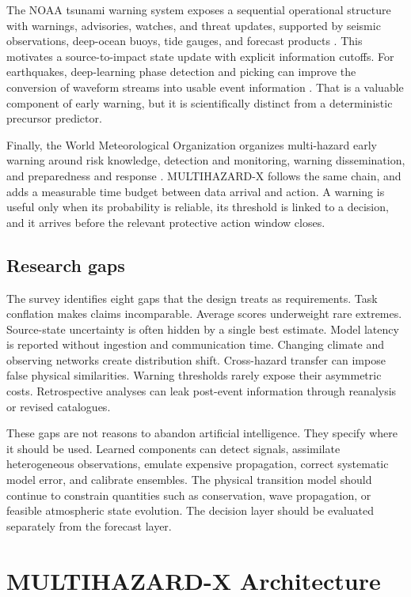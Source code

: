 \documentclass[conference]{IEEEtran}
\begin{document}
The NOAA tsunami warning system exposes a sequential operational structure with warnings, advisories, watches, and threat updates, supported by seismic observations, deep-ocean buoys, tide gauges, and forecast products \cite{noaa_tsunami}. This motivates a source-to-impact state update with explicit information cutoffs. For earthquakes, deep-learning phase detection and picking can improve the conversion of waveform streams into usable event information \cite{mousavi}. That is a valuable component of early warning, but it is scientifically distinct from a deterministic precursor predictor.

Finally, the World Meteorological Organization organizes multi-hazard early warning around risk knowledge, detection and monitoring, warning dissemination, and preparedness and response \cite{wmo}. MULTIHAZARD-X follows the same chain, and adds a measurable time budget between data arrival and action. A warning is useful only when its probability is reliable, its threshold is linked to a decision, and it arrives before the relevant protective action window closes.

\subsection{Research gaps}

The survey identifies eight gaps that the design treats as requirements. Task conflation makes claims incomparable. Average scores underweight rare extremes. Source-state uncertainty is often hidden by a single best estimate. Model latency is reported without ingestion and communication time. Changing climate and observing networks create distribution shift. Cross-hazard transfer can impose false physical similarities. Warning thresholds rarely expose their asymmetric costs. Retrospective analyses can leak post-event information through reanalysis or revised catalogues.

These gaps are not reasons to abandon artificial intelligence. They specify where it should be used. Learned components can detect signals, assimilate heterogeneous observations, emulate expensive propagation, correct systematic model error, and calibrate ensembles. The physical transition model should continue to constrain quantities such as conservation, wave propagation, or feasible atmospheric state evolution. The decision layer should be evaluated separately from the forecast layer.

\section{MULTIHAZARD-X Architecture}
\end{document}
